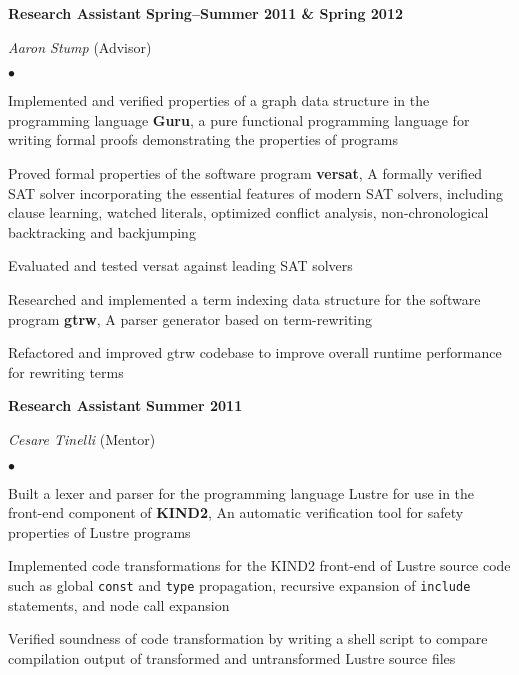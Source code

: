 \documentclass[10pt,letterpaper]{article}
\renewenvironment{itemize}{
  \begin{list}{}{
      \setlength{\leftmargin}{1.5em}
      \setlength{\itemsep}{0.25em}
      \setlength{\parskip}{0pt}
      \setlength{\parsep}{0.25em}
    }
  }{
  \end{list}
}
\newenvironment{bitemize}{
  \begin{list}{\(\bullet \)}{
      \setlength{\leftmargin}{1.5em}
      \setlength{\itemsep}{0.25em}
      \setlength{\parskip}{0pt}
      \setlength{\parsep}{0.25em}
    }
  }{
  \end{list}
}
\newcommand{\yearrange}[1]{\hfill \textbf{#1} \par}
\begin{document}
\begin{itemize}
\item \textbf{Research Assistant} \yearrange{Spring--Summer 2011
    \& Spring 2012}
  \textit{Aaron Stump} (Advisor)
  \begin{bitemize}
  \item Implemented and verified properties of a graph data structure
    in the programming language \textbf{Guru}, a pure functional
    programming language for writing formal proofs demonstrating the
    properties of programs
  \item Proved formal properties of the software program
    \textbf{versat}, A formally verified SAT solver incorporating the
    essential features of modern SAT solvers, including clause
    learning, watched literals, optimized conflict analysis,
    non-chronological backtracking and backjumping
  \item Evaluated and tested versat against leading SAT solvers
  \item Researched and implemented a term indexing data structure for
    the software program \textbf{gtrw}, A parser generator based on
    term-rewriting
  \item Refactored and improved gtrw codebase to improve overall
    runtime performance for rewriting terms
  \end{bitemize}
\item \textbf{Research Assistant} \yearrange{Summer 2011}
  \textit{Cesare Tinelli} (Mentor)
  \begin{bitemize}
  \item Built a lexer and parser for the programming language Lustre
    for use in the front-end component of \textbf{KIND2}, An automatic
    verification tool for safety properties of Lustre programs
  \item Implemented code transformations for the KIND2 front-end of
    Lustre source code such as global \texttt{const} and \texttt{type}
    propagation, recursive expansion of \texttt{include} statements,
    and node call expansion
  \item Verified soundness of code transformation by writing a shell
    script to compare compilation output of transformed and
    untransformed Lustre source files
  \end{bitemize}
\end{itemize}
\end{document}
